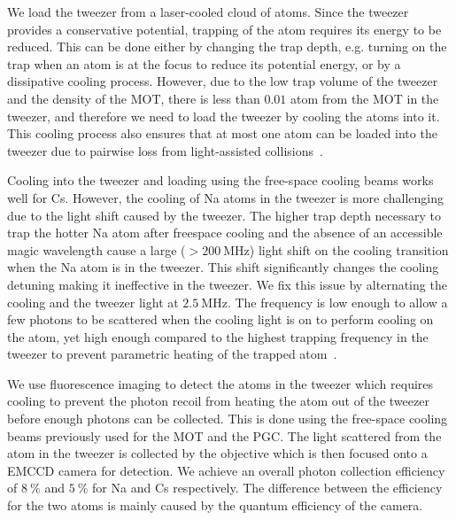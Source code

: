 We load the tweezer from a laser-cooled cloud of atoms.
Since the tweezer provides a conservative potential,
trapping of the atom requires its energy to be reduced.
This can be done either by changing the trap depth,
e.g. turning on the trap when an atom is at the focus to reduce its potential energy,
or by a dissipative cooling process.
However, due to the low trap volume of the tweezer and the density of the MOT,
there is less than $0.01$ atom from the MOT in the tweezer,
and therefore we need to load the tweezer by cooling the atoms into it.
This cooling process also ensures that at most one atom can be loaded into the tweezer
due to pairwise loss from light-assisted collisions~\cite{schlosser_sub-poissonian_2001}.

Cooling into the tweezer and loading using the free-space cooling beams works well for Cs.
However, the cooling of Na atoms in the tweezer is more challenging
due to the light shift caused by the tweezer.
The higher trap depth necessary to trap the hotter Na atom after freespace cooling
and the absence of an accessible magic wavelength cause a large ($>\!200~\mathrm{MHz}$)
light shift on the cooling transition when the Na atom is in the tweezer.
This shift significantly changes the cooling detuning making it ineffective in the tweezer.
We fix this issue by alternating the cooling and the tweezer light at $2.5~\mathrm{MHz}$.
The frequency is low enough to allow a few photons to be scattered
when the cooling light is on to perform cooling on the atom,
yet high enough compared to the highest trapping frequency in the tweezer
to prevent parametric heating of the trapped atom~\cite{hutzler_eliminating_2017}.

We use fluorescence imaging to detect the atoms in the tweezer
which requires cooling to prevent the photon recoil from heating the atom out of the tweezer
before enough photons can be collected.
This is done using the free-space cooling beams previously used for the MOT and the PGC.
The light scattered from the atom in the tweezer is collected by the objective
which is then focused onto a EMCCD camera for detection.
We achieve an overall photon collection efficiency of $8~\mathrm{\%}$ and $5~\mathrm{\%}$
for Na and Cs respectively.
The difference between the efficiency for the two atoms
is mainly caused by the quantum efficiency of the camera.


